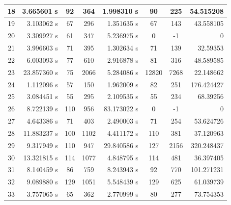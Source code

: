 \documentclass[a4paper]{article}
\begin{document}
\begin{center}
\begin{tabular}{|c|r|c|c|r|c|c|r|}
		18	& 3.665601 s	& 92	& 364	& 1.998310 s	& 90	& 225	& 54.515208 \\ \hline
		19	& 3.103062 s	& 67	& 296	& 1.351635 s	& 67	& 143	& 43.558105 \\ \hline
		20	& 3.309927 s	& 61	& 347	& 5.236975 s	& 0		& -1	& 0  \\ \hline
		21	& 3.996603 s	& 71	& 395	& 1.302634 s	& 71	& 139	& 32.59353 \\ \hline
		22	& 6.003093 s	& 77	& 610	& 2.916878 s	& 81	& 316	& 48.589585 \\ \hline
		23	& 23.857360 s	& 75	& 2066	& 5.284086 s	& 12820	& 7268	& 22.148662 \\ \hline
		24	& 1.112096 s	& 57	& 150	& 1.962009 s	& 82	& 251	& 176.424427 \\ \hline
		25	& 3.084451 s	& 55	& 295	& 2.109535 s	& 55	& 234	& 68.39256 \\ \hline
		26	& 8.722139 s	& 110	& 956	& 83.173022 s	& 0		& -1	& 0 \\ \hline
		27	& 4.643386 s	& 71	& 403	& 2.490003 s	& 71	& 254	& 53.624726 \\ \hline
		28	& 11.883237 s	& 100	& 1102	& 4.411172 s	& 110	& 381	& 37.120963 \\ \hline
		29	& 9.317949 s	& 110	& 947	& 29.840586 s	& 127	& 2156	& 320.248437 \\ \hline
		30	& 13.321815 s	& 114	& 1077	& 4.848795 s	& 114	& 481	& 36.397405 \\ \hline
		31	& 8.140459 s	& 86	& 759	& 8.243943 s	& 92	& 770	& 101.271231 \\ \hline
		32	& 9.089880 s	& 129	& 1051	& 5.548439 s	& 129	& 625	& 61.039739\\ \hline
		33	& 3.757065 s	& 65	& 362	& 2.770999 s	& 80	& 277	& 73.754353\\ \hline
	\end{tabular}	
\end{center}
\end{document}
